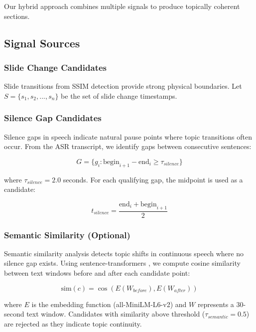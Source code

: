 \documentclass[12pt,a4paper]{article}
\begin{document}
Our hybrid approach combines multiple signals to produce topically coherent sections.

\subsection{Signal Sources}

\subsubsection{Slide Change Candidates}

Slide transitions from SSIM detection provide strong physical boundaries. Let $S = \{s_1, s_2, ..., s_n\}$ be the set of slide change timestamps.

\subsubsection{Silence Gap Candidates}

Silence gaps in speech indicate natural pause points where topic transitions often occur. From the ASR transcript, we identify gaps between consecutive sentences:

\begin{equation}
    G = \{g_i : \text{begin}_{i+1} - \text{end}_i \geq \tau_{silence}\}
\end{equation}

where $\tau_{silence} = 2.0$ seconds. For each qualifying gap, the midpoint is used as a candidate:

\begin{equation}
    t_{silence} = \frac{\text{end}_i + \text{begin}_{i+1}}{2}
\end{equation}

\subsubsection{Semantic Similarity (Optional)}

Semantic similarity analysis detects topic shifts in continuous speech where no silence gap exists. Using sentence-transformers \cite{reimers2019sentence}, we compute cosine similarity between text windows before and after each candidate point:

\begin{equation}
    \text{sim}(c) = \cos(E(W_{before}), E(W_{after}))
\end{equation}

where $E$ is the embedding function (all-MiniLM-L6-v2) and $W$ represents a 30-second text window. Candidates with similarity above threshold ($\tau_{semantic} = 0.5$) are rejected as they indicate topic continuity.
\end{document}

